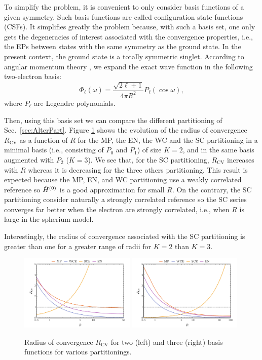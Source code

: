 \documentclass[11pt,a4paper]{article}
\newcommand{\hH}{\Hat{H}}
\begin{document}
To simplify the problem, it is convenient to only consider basis functions of a given symmetry. Such basis functions are called configuration state functions (CSFs). It simplifies greatly the problem because, with such a basis set, one only gets the degeneracies of interest associated with the convergence properties, i.e., the EPs between states with the same symmetry as the ground state. In the present context, the ground state is a totally symmetric singlet. According to angular momentum theory \cite{AngularBook, SlaterBook, Loos_2009}, we expand the exact wave function in the following two-electron basis:
\begin{equation}
\Phi_\ell(\omega)=\frac{\sqrt{2\ell+1}}{4\pi R^2}P_\ell(\cos\omega),
\end{equation}
where $P_\ell$ are Legendre polynomials.

Then, using this basis set we can compare the different partitioning of Sec.~\ref{sec:AlterPart}. Figure \ref{fig:RadiusPartitioning} shows the evolution of the radius of convergence $R_{\text{CV}}$ as a function of $R$ for the MP, the EN, the WC and the SC partitioning in a minimal basis (i.e., consisting of $P_0$ and $P_1$) of size $K = 2$, and in the same basis augmented with $P_2$ ($K = 3$). We see that, for the SC partitioning, $R_{\text{CV}}$ increases with $R$ whereas it is decreasing for the three others partitioning. This result is expected because the MP, EN, and WC partitioning use a weakly correlated reference so $\hH^{(0)}$ is a good approximation for small $R$. On the contrary, the SC partitioning consider naturally a strongly correlated reference so the SC series converges far better when the electron are strongly correlated, i.e., when $R$ is large in the spherium model.

Interestingly, the radius of convergence associated with the SC partitioning is greater than one for a greater range of radii for $K = 2$ than $K = 3$. 

\begin{figure}
    \centering
    \includegraphics[width=0.49\textwidth]{PartitioningRCV2.pdf}
    \includegraphics[width=0.49\textwidth]{PartitioningRCV3.pdf}
    \caption{Radius of convergence $R_{\text{CV}}$ for two (left) and three (right) basis functions for various partitionings.}
    \label{fig:RadiusPartitioning}
\end{figure}
\end{document}
